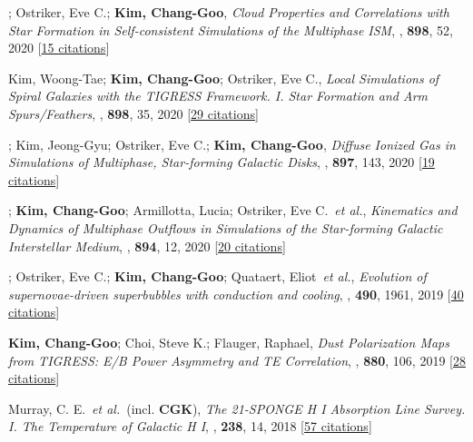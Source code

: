 \item[{22.}]; Ostriker, Eve C.; \textbf{Kim, Chang-Goo}, \textit{Cloud Properties and Correlations with Star Formation in Self-consistent Simulations of the Multiphase ISM}, , \textbf{898}, 52, 2020 [\href{http://adsabs.harvard.edu/abs/2020ApJ...898...52M}{15 citations}]

\item[{21.}]Kim, Woong-Tae; \textbf{Kim, Chang-Goo}; Ostriker, Eve C., \textit{Local Simulations of Spiral Galaxies with the TIGRESS Framework. I. Star Formation and Arm Spurs/Feathers}, , \textbf{898}, 35, 2020 [\href{http://adsabs.harvard.edu/abs/2020ApJ...898...35K}{29 citations}]

\item[{20.}]; Kim, Jeong-Gyu; Ostriker, Eve C.; \textbf{Kim, Chang-Goo}, \textit{Diffuse Ionized Gas in Simulations of Multiphase, Star-forming Galactic Disks}, , \textbf{897}, 143, 2020 [\href{http://adsabs.harvard.edu/abs/2020ApJ...897..143K}{19 citations}]

\item[{19.}]; \textbf{Kim, Chang-Goo}; Armillotta, Lucia; Ostriker, Eve C.~\textit{et al.}, \textit{Kinematics and Dynamics of Multiphase Outflows in Simulations of the Star-forming Galactic Interstellar Medium}, , \textbf{894}, 12, 2020 [\href{http://adsabs.harvard.edu/abs/2020ApJ...894...12V}{20 citations}]

\item[{18.}]; Ostriker, Eve C.; \textbf{Kim, Chang-Goo}; Quataert, Eliot~\textit{et al.}, \textit{Evolution of supernovae-driven superbubbles with conduction and cooling}, , \textbf{490}, 1961, 2019 [\href{http://adsabs.harvard.edu/abs/2019MNRAS.490.1961E}{40 citations}]

\item[{17.}]\textbf{Kim, Chang-Goo}; Choi, Steve K.; Flauger, Raphael, \textit{Dust Polarization Maps from TIGRESS: E/B Power Asymmetry and TE Correlation}, , \textbf{880}, 106, 2019 [\href{http://adsabs.harvard.edu/abs/2019ApJ...880..106K}{28 citations}]

\item[{16.}]Murray, C. E.~\textit{et al.}~(incl. \textbf{CGK}), \textit{The 21-SPONGE H I Absorption Line Survey. I. The Temperature of Galactic H I}, , \textbf{238}, 14, 2018 [\href{http://adsabs.harvard.edu/abs/2018ApJS..238...14M}{57 citations}]

